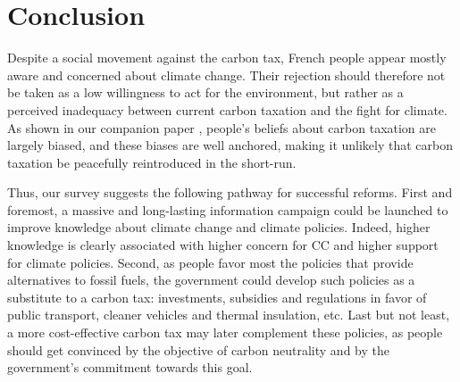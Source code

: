 \documentclass[english,5p,authoryear]{elsarticle}
\begin{document}





\section{Conclusion}\label{sec:conclusion}

Despite a social movement against the carbon tax, French people appear mostly aware and concerned about climate change. Their rejection should therefore not be taken as a low willingness to act for the environment, but rather as a perceived inadequacy between current carbon taxation and the fight for climate. As shown in our companion paper \citet{douenne_can_2019}, people's beliefs about carbon taxation are largely biased, and these biases are well anchored, making it unlikely that carbon taxation be peacefully reintroduced in the short-run. 

Thus, our survey suggests the following pathway for successful reforms. First and foremost, a massive and long-lasting information campaign could be launched to improve knowledge about climate change and climate policies. Indeed, higher knowledge is clearly associated with higher concern for CC and higher support for climate policies. Second, as people favor most the policies that provide alternatives to fossil fuels, the government could develop such policies as a substitute to a carbon tax: investments, subsidies and regulations in favor of public transport, cleaner vehicles and thermal insulation, etc. Last but not least, a more cost-effective carbon tax may later complement these policies, as people should get convinced by the objective of carbon neutrality and by the government's commitment towards this goal. 
\end{document}
